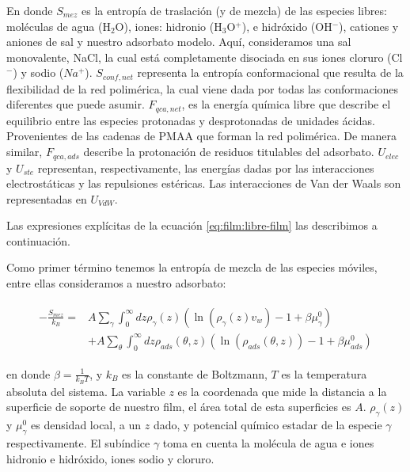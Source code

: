 \noindent En donde $S_{mez}$ es la entrop\'ia de traslaci\'on (y de mezcla) de las especies libres: mol\'eculas de agua (H$_2$O), iones:  hidronio (H$_3$O$^+$), e hidr\'oxido (OH$^- $), cationes y aniones de sal y nuestro adsorbato modelo. Aqu\'i, consideramos una sal monovalente, NaCl, la cual est\'a completamente disociada en sus  iones cloruro (Cl$^-$) y sodio ($Na^+$). 
$S_{conf,net}$ representa la entrop\'ia conformacional que resulta de la flexibilidad de la red polim\'erica, la cual viene dada por todas las conformaciones diferentes que puede asumir.
$F_{qca,net}$, es la energ\'ia qu\'imica libre que describe el equilibrio entre las especies protonadas y desprotonadas de unidades \'acidas. Provenientes de las cadenas de PMAA que forman la red polim\'erica.
De manera similar, $F_{qca,ads}$ describe la protonaci\'on de residuos titulables del adsorbato.
$U_{elec}$ y $U_{ste}$ representan, respectivamente, las energ\'ias dadas por las interacciones electrost\'aticas y las repulsiones est\'ericas.
Las interacciones de Van der Waals son representadas en $U_{VdW}$.


Las expresiones expl\'icitas de la ecuaci\'on \ref{eq:film:libre-film} las describimos a continuaci\'on.

Como primer t\'ermino tenemos la entrop\'ia de mezcla de  las especies m\'oviles, entre ellas consideramos a nuestro adsorbato: 

\begin{align}
	\begin{aligned}
		-\frac{S_{mez}}{k_B}= &A\sum_{\gamma}\int_0^\infty{dz\rho_\gamma(z)\left(\ln \left(\rho_\gamma (z)v_w\right) -1 + \beta\mu^0_\gamma\right)} \\
		&+ A\sum_{\theta}\int_0^\infty{dz\rho_{ads}(\theta,z)\left(\ln \left(\rho_{ads}(\theta,z)\right) -1 + \beta\mu^0_{ads} \right)}
			\label{eq:film:entropia-mezcla}
	\end{aligned}
\end{align}

\noindent en donde $\beta = \frac{1}{k_B T}$, y $k_B$ es la constante de Boltzmann, $T$ es la temperatura absoluta del sistema. La variable $z$ es la coordenada que mide la distancia a la superficie de soporte de nuestro film, el \'area total de esta superficies es $A$. $\rho_\gamma(z)$ y $\mu^0_\gamma$ es densidad local, a un $z$ dado, y potencial qu\'imico estadar de la especie $\gamma$ respectivamente.
El sub\'indice $\gamma$ toma en cuenta la mol\'ecula de agua e iones hidronio e hidr\'oxido, iones sodio y cloruro.  


